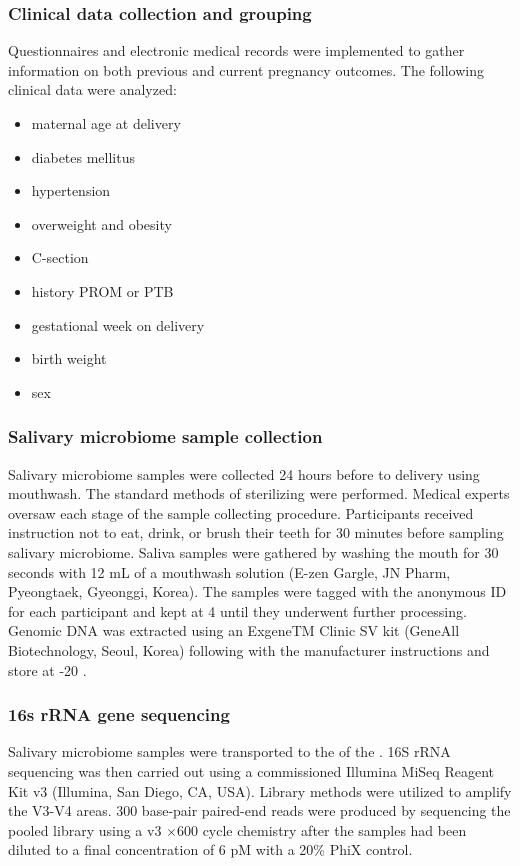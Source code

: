 \documentclass[11pt, a4paper, onecolumn, oneside]{report}
\begin{document}
            \subsubsection{Clinical data collection and grouping}
                Questionnaires and electronic medical records were implemented to gather information on both previous and current pregnancy outcomes. The following clinical data were analyzed:
                \begin{itemize}
                    \item maternal age at delivery
                    \item diabetes mellitus
                    \item hypertension
                    \item overweight and obesity
                    \item C-section
                    \item history PROM or PTB
                    \item gestational week on delivery
                    \item birth weight
                    \item sex
                \end{itemize}

            \subsubsection{Salivary microbiome sample collection}
                Salivary microbiome samples were collected 24 hours before to delivery using mouthwash. The standard methods of sterilizing were performed. Medical experts oversaw each stage of the sample collecting procedure. Participants received instruction not to eat, drink, or brush their teeth for 30 minutes before sampling salivary microbiome. Saliva samples were gathered by washing the mouth for 30 seconds with 12 mL of a mouthwash solution (E-zen Gargle, JN Pharm, Pyeongtaek, Gyeonggi, Korea). The samples were tagged with the anonymous ID for each participant and kept at 4 \textcelsius until they underwent further processing. Genomic DNA was extracted using an ExgeneTM Clinic SV kit (GeneAll Biotechnology, Seoul, Korea) following with the manufacturer instructions and store at -20 \textcelsius.

            \subsubsection{16s rRNA gene sequencing}
                Salivary microbiome samples were transported to the  of the . 16S rRNA sequencing was then carried out using a commissioned Illumina MiSeq Reagent Kit v3 (Illumina, San Diego, CA, USA). Library methods were utilized to amplify the V3-V4 areas. 300 base-pair paired-end reads were produced by sequencing the pooled library using a v3 $\times$600 cycle chemistry after the samples had been diluted to a final concentration of 6 pM with a 20\% PhiX control.
\end{document}
